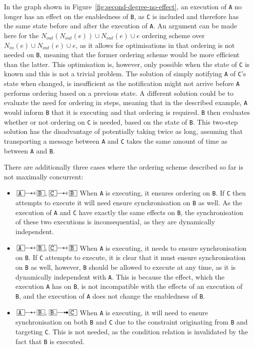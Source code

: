 \documentclass{article}
\begin{document}
	In the graph shown in Figure~\ref{fig:second-degree-no-effect}, an execution of \texttt{A} no longer has an effect on the enabledness of \texttt{B}, as \texttt{C} is included and therefore has the same state before and after the execution of \texttt{A}.
	An argument can be made here for the $N_{out}(N_{out}(e)) \cup N_{out}(e) \cup e$ ordering scheme over $N_{in}(e) \cup N_{out}(e) \cup e$, as it allows for optimisations in that ordering is not needed on \texttt{B}, meaning that the former ordering scheme would be more efficient than the latter.
	This optimisation is, however, only possible when the state of \texttt{C} is known and this is not a trivial problem.
	The solution of simply notifying \texttt{A} of \texttt{C}'s state when changed, is insufficient as the notification might not arrive before \texttt{A} performs ordering based on a previous state.
	A different solution could be to evaluate the need for ordering in steps, meaning that in the described example, \texttt{A} would inform \texttt{B} that it is executing and that ordering is required. \texttt{B} then evaluates whether or not ordering on \texttt{C} is needed, based on the state of \texttt{B}.
	This two-step solution has the disadvantage of potentially taking twice as long, assuming that transporting a message between \texttt{A} and \texttt{C} takes the same amount of time as between \texttt{A} and \texttt{B}.

	There are additionally three cases where the ordering scheme described so far is not maximally concurrent:
	\begin{itemize}
		\item $\ev{A} \erel \ev{B}, \ev{C} \erel \ev{B}$ When \texttt{A} is executing, it ensures ordering on \texttt{B}.
        If \texttt{C} then attempts to execute it will need ensure synchronisation on \texttt{B} as well.
        As the execution of \texttt{A} and \texttt{C} have exactly the same effects on \texttt{B}, the synchronisation of these two executions is inconsequential, as they are dynamically independent.
		\item $\ev{A} \irel \ev{B}, \ev{C} \erel \ev{B}$ When \texttt{A} is executing, it needs to ensure synchronisation on \texttt{B}.
        If \texttt{C} attempts to execute, it is clear that it must ensure synchronisation on \texttt{B} as well, however, \texttt{B} should be allowed to execute at any time, as it is dynamically independent with \texttt{A}.
        This is because the effect, which the execution \texttt{A} has on \texttt{B}, is not incompatible with the effects of an execution of \texttt{B}, and the execution of \texttt{A} does not change the enabledness of \texttt{B}.
		\item $\ev{A} \irel \ev[100]{B}, \ev[100]{B} \crel \ev{C}$ When \texttt{A} is executing, it will need to ensure synchronisation on both \texttt{B} and \texttt{C} due to the constraint originating from \texttt{B} and targeting \texttt{C}.
        This is not needed, as the condition relation is invalidated by the fact that \texttt{B} is executed.
	\end{itemize}
\end{document}
